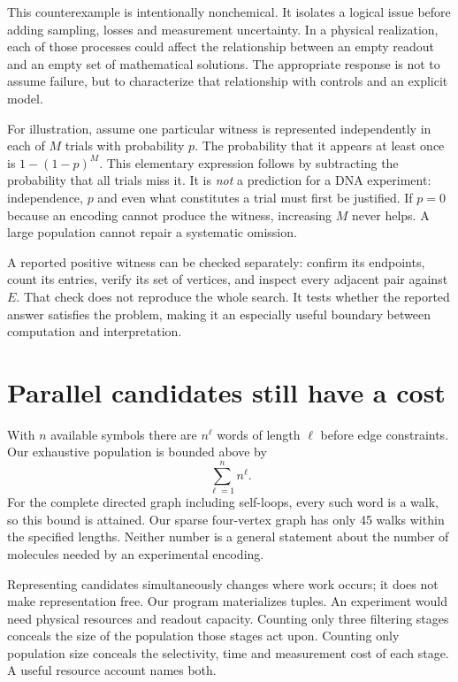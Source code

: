This counterexample is intentionally nonchemical. It isolates a logical issue
before adding sampling, losses and measurement uncertainty. In a physical
realization, each of those processes could affect the relationship between
an empty readout and an empty set of mathematical solutions. The appropriate
response is not to assume failure, but to characterize that relationship with
controls and an explicit model.

For illustration, assume one particular witness is represented independently
in each of $M$ trials with probability $p$. The probability that it appears at
least once is $1-(1-p)^M$. This elementary expression follows by subtracting
the probability that all trials miss it. It is \emph{not} a prediction for a
DNA experiment: independence, $p$ and even what constitutes a trial must first
be justified. If $p=0$ because an encoding cannot produce the witness, increasing
$M$ never helps. A large population cannot repair a systematic omission.

A reported positive witness can be checked separately: confirm its endpoints,
count its entries, verify its set of vertices, and inspect every adjacent pair
against $E$. That check does not reproduce the whole search. It tests whether
the reported answer satisfies the problem, making it an especially useful
boundary between computation and interpretation.

\section{Parallel candidates still have a cost}
With $n$ available symbols there are $n^\ell$ words of length $\ell$ before edge
constraints. Our exhaustive population is bounded above by
\[
 \sum_{\ell=1}^{n} n^\ell.
\]
For the complete directed graph including self-loops, every such word is a
walk, so this bound is attained. Our sparse four-vertex graph has only 45
walks within the specified lengths. Neither number is a general statement
about the number of molecules needed by an experimental encoding.

Representing candidates simultaneously changes where work occurs; it does not
make representation free. Our program materializes tuples. An experiment
would need physical resources and readout capacity. Counting only three
filtering stages conceals the size of the population those stages act upon.
Counting only population size conceals the selectivity, time and measurement
cost of each stage. A useful resource account names both.

